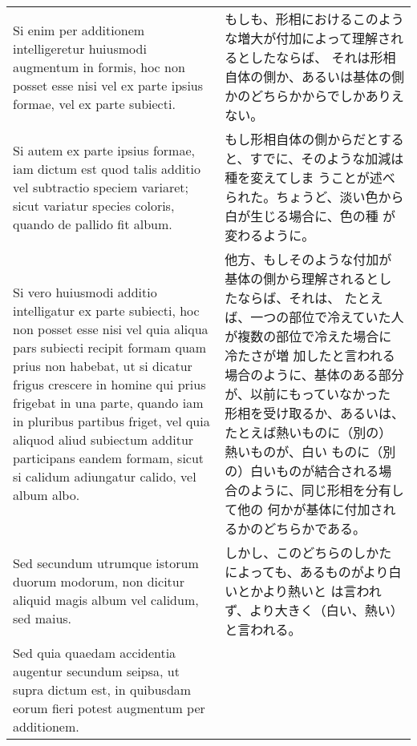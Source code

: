 \documentclass[10pt]{jsarticle} %
\begin{document}
\begin{longtable}{p{21em}p{21em}}
\\

Si enim per additionem intelligeretur
huiusmodi augmentum in formis, hoc non posset esse nisi vel ex parte
ipsius formae, vel ex parte subiecti. 


&

もしも、形相におけるこのような増大が付加によって理解されるとしたならば、
それは形相自体の側か、あるいは基体の側かのどちらかからでしかありえない。

\\


Si autem ex parte ipsius formae,
iam dictum est quod talis additio vel subtractio speciem variaret;
sicut variatur species coloris, quando de pallido fit album. 


&

もし形相自体の側からだとすると、すでに、そのような加減は種を変えてしま
うことが述べられた。ちょうど、淡い色から白が生じる場合に、色の種
が変わるように。

\\


Si vero
huiusmodi additio intelligatur ex parte subiecti, hoc non posset esse
nisi vel quia aliqua pars subiecti recipit formam quam prius non
habebat, ut si dicatur frigus crescere in homine qui prius frigebat in
una parte, quando iam in pluribus partibus friget, vel quia aliquod
aliud subiectum additur participans eandem formam, sicut si calidum
adiungatur calido, vel album albo. 


&

他方、もしそのような付加が基体の側から理解されるとしたならば、それは、
たとえば、一つの部位で冷えていた人が複数の部位で冷えた場合に冷たさが増
加したと言われる場合のように、基体のある部分が、以前にもっていなかった
形相を受け取るか、あるいは、たとえば熱いものに（別の）熱いものが、白い
ものに（別の）白いものが結合される場合のように、同じ形相を分有して他の
何かが基体に付加されるかのどちらかである。


\\


Sed secundum utrumque istorum
duorum modorum, non dicitur aliquid magis album vel calidum, sed
maius. 

&

しかし、このどちらのしかたによっても、あるものがより白いとかより熱いと
は言われず、より大きく（白い、熱い）と言われる。

\\

Sed quia quaedam accidentia augentur secundum seipsa, ut supra
dictum est, in quibusdam eorum fieri potest augmentum per
additionem. 


\end{longtable}
\end{document}
